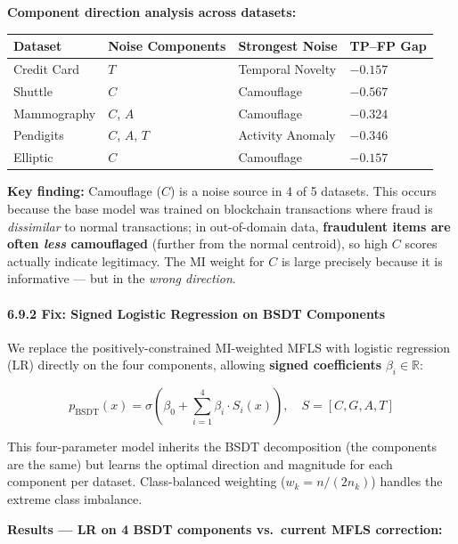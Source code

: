 \documentclass[
  11pt,
]{article}
\newcounter{none} %
\begin{document}
\textbf{Component direction analysis across datasets:}

{\def\LTcaptype{none} %
\begin{longtable}[]{@{}llll@{}}
\toprule\noalign{}
Dataset & Noise Components & Strongest Noise & TP–FP Gap \\
\midrule\noalign{}
\endhead
\bottomrule\noalign{}
\endlastfoot
Credit Card & \(T\) & Temporal Novelty & \(-0.157\) \\
Shuttle & \(C\) & Camouflage & \(-0.567\) \\
Mammography & \(C\), \(A\) & Camouflage & \(-0.324\) \\
Pendigits & \(C\), \(A\), \(T\) & Activity Anomaly & \(-0.346\) \\
Elliptic & \(C\) & Camouflage & \(-0.157\) \\
\end{longtable}
}

\textbf{Key finding:} Camouflage (\(C\)) is a noise source in 4 of 5
datasets. This occurs because the base model was trained on blockchain
transactions where fraud is \emph{dissimilar} to normal transactions; in
out-of-domain data, \textbf{fraudulent items are often \emph{less}
camouflaged} (further from the normal centroid), so high \(C\) scores
actually indicate legitimacy. The MI weight for \(C\) is large precisely
because it is informative — but in the \emph{wrong direction}.

\paragraph{6.9.2 Fix: Signed Logistic Regression on BSDT
Components}\label{fix-signed-logistic-regression-on-bsdt-components}

We replace the positively-constrained MI-weighted MFLS with logistic
regression (LR) directly on the four components, allowing \textbf{signed
coefficients} \(\beta_i \in \mathbb{R}\):

\[p_{\text{BSDT}}(x) = \sigma\!\left(\beta_0 + \sum_{i=1}^{4} \beta_i \cdot S_i(x)\right), \quad S = [C, G, A, T]\]

This four-parameter model inherits the BSDT decomposition (the
components are the same) but learns the optimal direction and magnitude
for each component per dataset. Class-balanced weighting
(\(w_k = n / (2 n_k)\)) handles the extreme class imbalance.

\textbf{Results — LR on 4 BSDT components vs.~current MFLS correction:}
\end{document}
